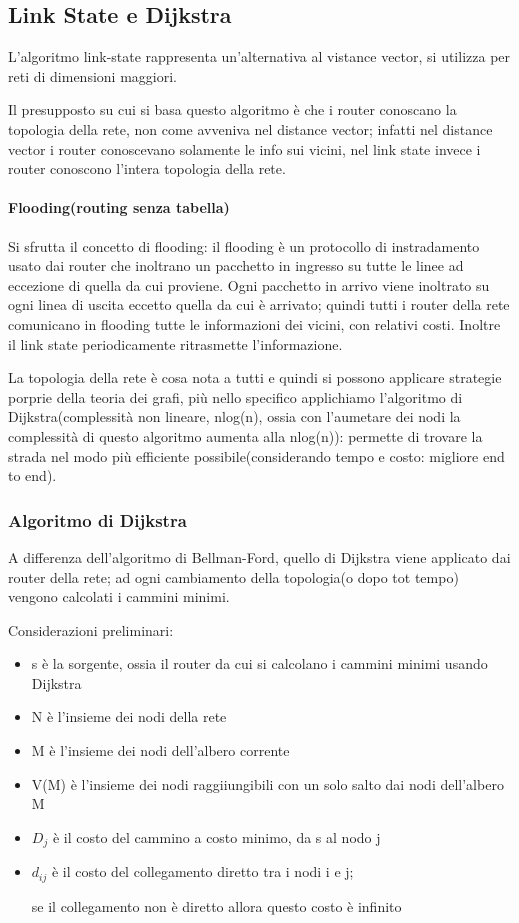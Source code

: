 \subsection{Link State e Dijkstra}

L'algoritmo link-state rappresenta un'alternativa al vistance vector, si utilizza per reti di dimensioni maggiori.

Il presupposto su cui si basa questo algoritmo è che i router conoscano la topologia della rete, non come avveniva nel distance vector; infatti nel distance vector i router conoscevano solamente le info sui vicini, nel link state invece i router conoscono l'intera topologia della rete.

\paragraph{Flooding(routing senza tabella)}
Si sfrutta il concetto di flooding: il flooding è un protocollo di instradamento usato dai router che inoltrano un pacchetto in ingresso su tutte le linee ad eccezione di quella da cui proviene. Ogni pacchetto in arrivo viene inoltrato su ogni linea di uscita eccetto quella da cui è arrivato;
quindi tutti i router della rete comunicano in flooding tutte le informazioni dei vicini, con relativi costi. Inoltre il link state periodicamente ritrasmette l'informazione.

La topologia della rete è cosa nota a tutti e quindi si possono applicare strategie porprie della teoria dei grafi, più nello specifico applichiamo l'algoritmo di Dijkstra(complessità non lineare, nlog(n), ossia con l'aumetare dei nodi la complessità di questo algoritmo aumenta alla nlog(n)):
permette di trovare la strada nel modo più efficiente possibile(considerando tempo e costo: migliore end to end).


\subsubsection{Algoritmo di Dijkstra}


A differenza dell'algoritmo di Bellman-Ford, quello di Dijkstra viene applicato dai router della rete; ad ogni cambiamento della topologia(o dopo tot tempo) vengono calcolati i cammini minimi.

Considerazioni preliminari:

\begin{itemize}
    \item s è la sorgente, ossia il router da cui si calcolano i cammini minimi usando Dijkstra
    \item N è l'insieme dei nodi della rete
    \item M è l'insieme dei nodi dell'albero corrente
    \item V(M) è l'insieme dei nodi raggiiungibili con un solo salto dai nodi dell'albero M
    \item $D_j$ è il costo del cammino a costo minimo, da s al nodo j
    \item $d_{ij}$ è il costo del collegamento diretto tra i nodi i e j;
    
    se il collegamento non è diretto allora questo costo è infinito
\end{itemize}

